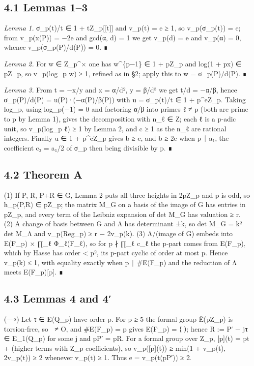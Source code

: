 \documentclass[11pt,a4paper]{article}
\theoremstyle{named}
\begin{document}
\subsection*{4.1 Lemmas 1–3}

\textit{Lemma 1.} σ\_p(t)/t ∈ 1 + tZ\_p[[t]] and v\_p(t) = e ≥ 1, so v\_p(σ\_p(t)) = e; from v\_p(x(P)) = −2e and gcd(α, d) = 1 we get v\_p(d) = e and v\_p(α) = 0, whence v\_p(σ\_p(P)/d(P)) = 0. ∎

\textit{Lemma 2.} For w ∈ Z\_p\textasciicircum{}× one has w\textasciicircum{}\{p−1\} ∈ 1 + pZ\_p and log(1 + px) ∈ pZ\_p, so v\_p(log\_p w) ≥ 1, refined as in §2; apply this to w = σ\_p(P)/d(P). ∎

\textit{Lemma 3.} From t = −x/y and x = α/d², y = β/d³ we get t/d = −α/β, hence σ\_p(P)/d(P) = u(P)·(−α(P)/β(P)) with u = σ\_p(t)/t ∈ 1 + p\textasciicircum{}eZ\_p. Taking log\_p, using log\_p(−1) = 0 and factoring α/β into primes ℓ ≠ p (both are prime to p by Lemma 1), gives the decomposition with n\_ℓ ∈ Z; each ℓ is a p-adic unit, so v\_p(log\_p ℓ) ≥ 1 by Lemma 2, and c ≥ 1 as the n\_ℓ are rational integers. Finally u ∈ 1 + p\textasciicircum{}eZ\_p gives b ≥ e, and b ≥ 2e when p ∣ a₁, the coefficient c₂ = a₁/2 of σ\_p then being divisible by p. ∎

\subsection*{4.2 Theorem A}

(1) If P, R, P+R ∈ G, Lemma 2 puts all three heights in 2pZ\_p and p is odd, so h\_p(P,R) ∈ pZ\_p; the matrix M\_G on a basis of the image of G has entries in pZ\_p, and every term of the Leibniz expansion of det M\_G has valuation ≥ r. (2) A change of basis between G and Λ has determinant ±k, so det M\_G = k² det M\_Λ and v\_p(Reg\_p) ≥ r − 2v\_p(k). (3) Λ/(image of G) embeds into E(F\_p) × ∏\_ℓ Φ\_ℓ(F\_ℓ), so for p ∤ ∏\_ℓ c\_ℓ the p-part comes from E(F\_p), which by Hasse has order \textless{} p², its p-part cyclic of order at most p. Hence v\_p(k) ≤ 1, with equality exactly when p ∣ \#E(F\_p) and the reduction of Λ meets E(F\_p)[p]. ∎

\subsection*{4.3 Lemmas 4 and 4′}

(⟹) Let τ ∈ E(Q\_p) have order p. For p ≥ 5 the formal group Ê(pZ\_p) is torsion-free, so  ≠ O, and \#E(F\_p) = p gives E(F\_p) = ⟨⟩; hence R := P′ − jτ ∈ E\_1(Q\_p) for some j and pP′ = pR. For a formal group over Z\_p, [p](t) = pt + (higher terms with Z\_p coefficients), so v\_p([p](t)) ≥ min(1 + v\_p(t), 2v\_p(t)) ≥ 2 whenever v\_p(t) ≥ 1. Thus e = v\_p(t(pP′)) ≥ 2.
\end{document}
